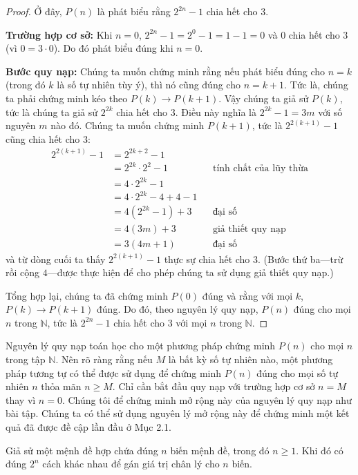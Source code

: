 \begin{proof}
Ở đây, $P(n)$ là phát biểu rằng $2^{2n} - 1$ chia hết cho $3$.

\textbf{Trường hợp cơ sở:} Khi $n = 0$, $2^{2n} - 1 = 2^0 - 1 = 1 - 1 = 0$ và $0$ chia hết cho $3$ (vì $0 = 3 \cdot 0$). Do đó phát biểu đúng khi $n = 0$.

\textbf{Bước quy nạp:} Chúng ta muốn chứng minh rằng nếu phát biểu đúng cho $n = k$ (trong đó $k$ là số tự nhiên tùy ý), thì nó cũng đúng cho $n = k + 1$. Tức là, chúng ta phải chứng minh kéo theo $P(k) \to P(k+1)$. Vậy chúng ta giả sử $P(k)$, tức là chúng ta giả sử $2^{2k}$ chia hết cho $3$. Điều này nghĩa là $2^{2k} - 1 = 3m$ với số nguyên $m$ nào đó. Chúng ta muốn chứng minh $P(k+1)$, tức là $2^{2(k+1)} - 1$ cũng chia hết cho $3$:
\begin{align*}
2^{2(k+1)} - 1 &= 2^{2k+2} - 1 \\
&= 2^{2k} \cdot 2^2 - 1 && \text{tính chất của lũy thừa}\\
&= 4 \cdot 2^{2k} - 1 \\
&= 4 \cdot 2^{2k} - 4 + 4 - 1 \\
&= 4(2^{2k} - 1) + 3 && \text{đại số}\\
&= 4(3m) + 3 && \text{giả thiết quy nạp}\\
&= 3(4m + 1) && \text{đại số}
\end{align*}
và từ dòng cuối ta thấy $2^{2(k+1)} - 1$ thực sự chia hết cho $3$. (Bước thứ ba---trừ rồi cộng $4$---được thực hiện để cho phép chúng ta sử dụng giả thiết quy nạp.)

Tổng hợp lại, chúng ta đã chứng minh $P(0)$ đúng và rằng với mọi $k$, $P(k) \to P(k+1)$ đúng. Do đó, theo nguyên lý quy nạp, $P(n)$ đúng cho mọi $n$ trong $\mathbb{N}$, tức là $2^{2n} - 1$ chia hết cho $3$ với mọi $n$ trong $\mathbb{N}$.
\end{proof}

Nguyên lý quy nạp toán học cho một phương pháp chứng minh $P(n)$ cho mọi $n$ trong tập $\mathbb{N}$. Nên rõ ràng rằng nếu $M$ là bất kỳ số tự nhiên nào, một phương pháp tương tự có thể được sử dụng để chứng minh $P(n)$ đúng cho mọi số tự nhiên $n$ thỏa mãn $n \geq M$. Chỉ cần bắt đầu quy nạp với trường hợp cơ sở $n = M$ thay vì $n = 0$. Chúng tôi để chứng minh mở rộng này của nguyên lý quy nạp như bài tập. Chúng ta có thể sử dụng nguyên lý mở rộng này để chứng minh một kết quả đã được đề cập lần đầu ở Mục 2.1.

\begin{theorem}
Giả sử một mệnh đề hợp chứa đúng $n$ biến mệnh đề, trong đó $n \geq 1$. Khi đó có đúng $2^n$ cách khác nhau để gán giá trị chân lý cho $n$ biến.
\end{theorem}

